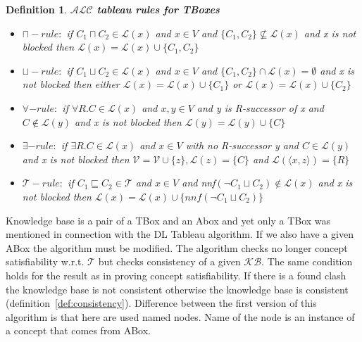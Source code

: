 \documentclass[12pt,a4paper]{article}
\newtheorem{definition}{Definition}[subsection]
\begin{document}
\begin{definition}{\textbf{$\mathcal{ALC}$ tableau rules for TBoxes}}
	\begin{itemize}
		\item $\sqcap-rule:$ if $C_{1} \sqcap C_{2} \in \mathcal{L}(x)$ and $x \in V$ and $\{ C_{1}, C_{2} \} \not \subseteq \mathcal{L}(x)$ and x is not blocked then $\mathcal{L}(x) = \mathcal{L}(x) \cup \{ C_{1}, C_{2} \}$
		
		\item $\sqcup-rule:$ if $C_{1} \sqcup C_{2} \in \mathcal{L}(x)$ and $x \in V$ and $ \{ C_{1}, C_{2} \} \cap \mathcal{L}(x) = \emptyset$ and x is not blocked then either $\mathcal{L}(x) = \mathcal{L}(x) \cup \{ C_{1} \}$ or $\mathcal{L}(x) = \mathcal{L}(x) \cup \{ C_{2} \}$
		
		\item $\forall-rule:$ if $\forall R.C \in \mathcal{L}(x)$ and $x,y \in V$ and y is R-successor of x and $C \not \in \mathcal{L}(y)$ and x is not blocked then $\mathcal{L}(y) = \mathcal{L}(y) \cup \{ C \}$
		
		\item $\exists-rule:$ if $\exists R.C \in \mathcal{L}(x)$ and $x \in V$ with no R-successor y and $C \in \mathcal{L}(y)$ and x is not blocked then $\mathcal{V} = \mathcal{V} \cup \{ z \}, \mathcal{L}(z) = \{ C\}$ and $\mathcal{L}( \langle x, z \rangle ) = \{ R \}$
		
		\item $\mathcal{T}-rule:$ if $C_{1} \sqsubseteq C_{2} \in \mathcal{T}$ and $x \in V$ and nnf$(\neg C_{1} \sqcup C_{2}) \not \in \mathcal{L}(x)$ and x is not blocked then $\mathcal{L}(x) = \mathcal{L}(x) \cup \{ nnf(\neg C_{1} \sqcup C_{2}) \}$
	\end{itemize}
\end{definition}	

Knowledge base is a pair of a TBox and an Abox and yet only a TBox was mentioned in connection with the DL Tableau algorithm. If we also have a given ABox the algorithm must be modified. The algorithm checks no longer concept satisfiability w.r.t. $\mathcal{T}$ but checks consistency of a given $\mathcal{KB}$. The same condition holds for the result as in proving concept satisfiability. If there is a found clash the knowledge base is not consistent otherwise the knowledge base is consistent (definition~\ref{def:consistency}). Difference between the first version of this algorithm is that here are used named nodes. Name of the node is an instance of a concept that comes from ABox. 
\end{document}
